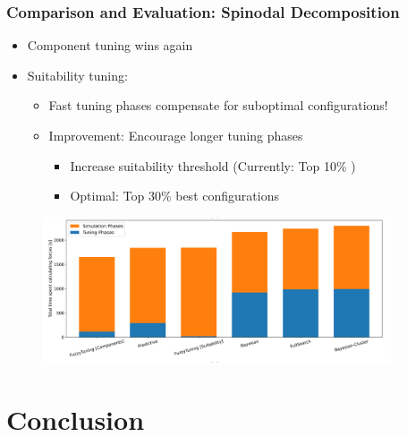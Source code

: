 \documentclass[
	10pt,
	t		%
]{beamer}
\begin{document}
\begin{frame}
	\frametitle{Comparison and Evaluation: Spinodal Decomposition}
	
	\begin{itemize}
		\item Component tuning wins again
		\item Suitability tuning:
		      \begin{itemize}
			      \item Fast tuning phases compensate for suboptimal configurations!
			      \item Improvement: Encourage longer tuning phases
			            \begin{itemize}
				            \item Increase suitability threshold {\scriptsize (Currently: Top 10\% )}
				            \item Optimal: Top 30\% best configurations
			            \end{itemize}
		      \end{itemize}
	\end{itemize}
	
	\begin{figure}
		\centering
		\includegraphics[width=0.92\textwidth]{figures/spinodal-total.png}
	\end{figure}
\end{frame}


\section{Conclusion}
\end{document}

